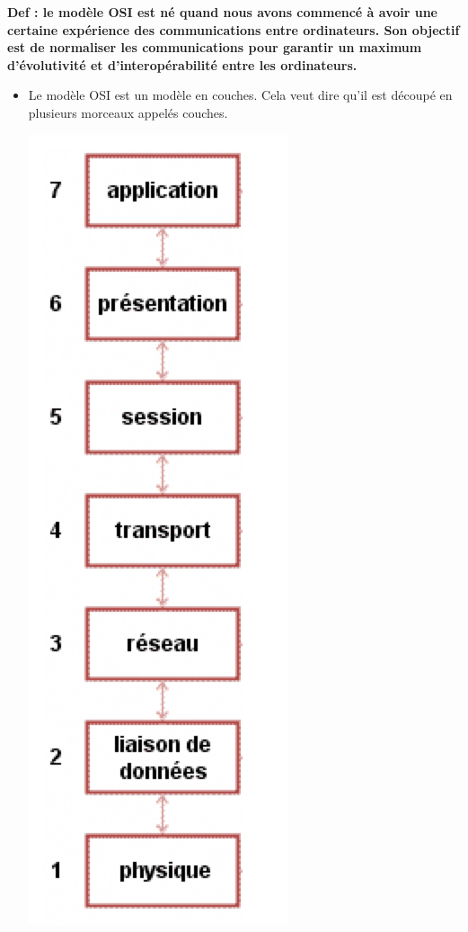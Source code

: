 \documentclass[a4paper,9pt, twocolumn]{article}
\begin{document}
	\textbf{Def : le modèle OSI est né quand nous avons commencé à avoir une certaine expérience des communications entre ordinateurs. Son objectif est de normaliser les communications pour garantir un maximum d'évolutivité et d'interopérabilité entre les ordinateurs.}
	
	\begin{itemize}
		\item Le modèle OSI est un modèle en couches. Cela veut dire qu'il est découpé en plusieurs morceaux appelés couches.
		\begin{center}
		\includegraphics[scale=0.4]{couches.png}

\end{center}
\end{itemize}
\end{document}
